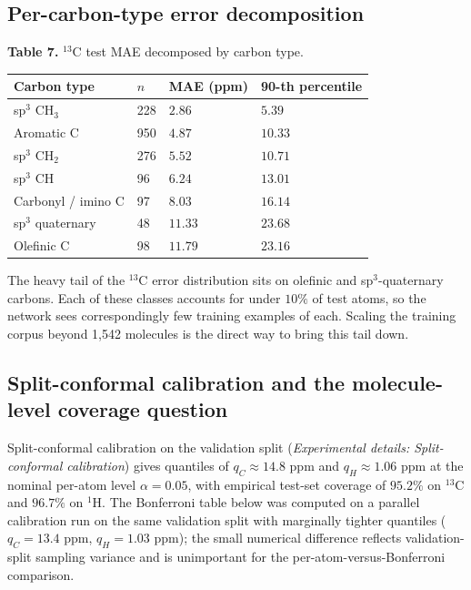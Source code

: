 \documentclass[
  11pt,
  a4paper,
]{article}
\newcounter{none} %
\begin{document}
\subsection*{Per-carbon-type error decomposition}

\textbf{Table 7.} \(^{13}\)C test MAE decomposed by carbon type.

{\def\LTcaptype{none} %
\begin{longtable}[]{@{}llll@{}}
\toprule\noalign{}
Carbon type & \(n\) & MAE (ppm) & 90-th percentile \\
\midrule\noalign{}
\endhead
\bottomrule\noalign{}
\endlastfoot
sp\(^3\) CH\(_{3}\) & 228 & \(2.86\) & \(5.39\) \\
Aromatic C & 950 & \(4.87\) & \(10.33\) \\
sp\(^3\) CH\(_{2}\) & 276 & \(5.52\) & \(10.71\) \\
sp\(^3\) CH & 96 & \(6.24\) & \(13.01\) \\
Carbonyl / imino C & 97 & \(8.03\) & \(16.14\) \\
sp\(^3\) quaternary & 48 & \(11.33\) & \(23.68\) \\
Olefinic C & 98 & \(11.79\) & \(23.16\) \\
\end{longtable}
}

The heavy tail of the \(^{13}\)C error distribution sits on olefinic
and sp\(^3\)-quaternary carbons. Each of these classes accounts for
under \(10\%\) of test atoms, so the network sees correspondingly few
training examples of each. Scaling the training corpus beyond 1,542
molecules is the direct way to bring this tail down.

\subsection*{Split-conformal calibration and the molecule-level coverage question}

Split-conformal calibration on the validation split (\emph{Experimental details: Split-conformal calibration})
gives quantiles of \(q_{C} \approx 14.8\) ppm and \(q_{H} \approx 1.06\)
ppm at the nominal per-atom level \(\alpha = 0.05\), with empirical
test-set coverage of \(95.2\%\) on \(^{13}\)C and \(96.7\%\) on \(^{1}\)H.
The Bonferroni table below was computed on a parallel calibration
run on the same validation split with marginally tighter quantiles
(\(q_{C} = 13.4\) ppm, \(q_{H} = 1.03\) ppm); the small numerical
difference reflects validation-split sampling variance and is
unimportant for the per-atom-versus-Bonferroni comparison.
\end{document}
